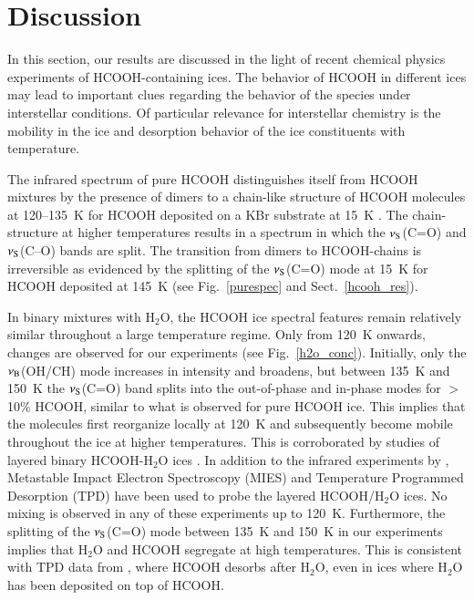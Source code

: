 \documentclass{aa}
\begin{document}
\section{Discussion}
\label{chemdisc}

In this section, our results are discussed in the light of recent
chemical physics experiments of HCOOH-containing ices. The behavior of
HCOOH in different ices may lead to important clues regarding the
behavior of the species under interstellar conditions. Of particular
relevance for interstellar chemistry is the mobility in the ice and
desorption behavior of the ice constituents with temperature.

The infrared spectrum of pure HCOOH distinguishes itself from HCOOH
mixtures by the presence of dimers to a chain-like structure of HCOOH
molecules at 120--135~K for HCOOH deposited on a KBr substrate at 15~K
\citep[see e.g.,][]{cyriac2005}. The chain-structure at higher
temperatures results in a spectrum in which the $\nu_{\rm S}$(C=O) and
$\nu_{\rm S}$(C--O) bands are split. The transition from dimers to
HCOOH-chains is irreversible as evidenced by the splitting of the
$\nu_{\rm S}$(C=O) mode at 15~K for HCOOH deposited at 145~K (see
Fig.~\ref{purespec} and Sect.~\ref{hcooh_res}).

In binary mixtures with H$_2$O, the HCOOH ice spectral features remain
relatively similar throughout a large temperature regime. Only from
120~K onwards, changes are observed for our experiments (see
Fig.~\ref{h2o_conc}). Initially, only the $\nu_{\rm B}$(OH/CH) mode
increases in intensity and broadens, but between 135~K and 150~K the
$\nu_{\rm S}$(C=O) band splits into the out-of-phase and in-phase
modes for $>$10\% HCOOH, similar to what is observed for pure HCOOH
ice. This implies that the molecules first reorganize locally at 120~K
and subsequently become mobile throughout the ice at higher
temperatures. This is corroborated by studies of layered binary
HCOOH-H$_2$O ices
\citep{cyriac2005,borodin2005,bahr2005,souda2006}. In addition to the
infrared experiments by \citet{cyriac2005}, Metastable Impact Electron
Spectroscopy (MIES) and Temperature Programmed Desorption (TPD) have
been used to probe the layered HCOOH/H$_2$O ices. No mixing is
observed in any of these experiments up to 120~K. Furthermore, the
splitting of the $\nu_{\rm S}$(C=O) mode between 135~K and 150~K in
our experiments implies that H$_2$O and HCOOH segregate at high
temperatures. This is consistent with TPD data from \citet{bahr2005},
where HCOOH desorbs after H$_2$O, even in ices where H$_2$O has been
deposited on top of HCOOH.
\end{document}

